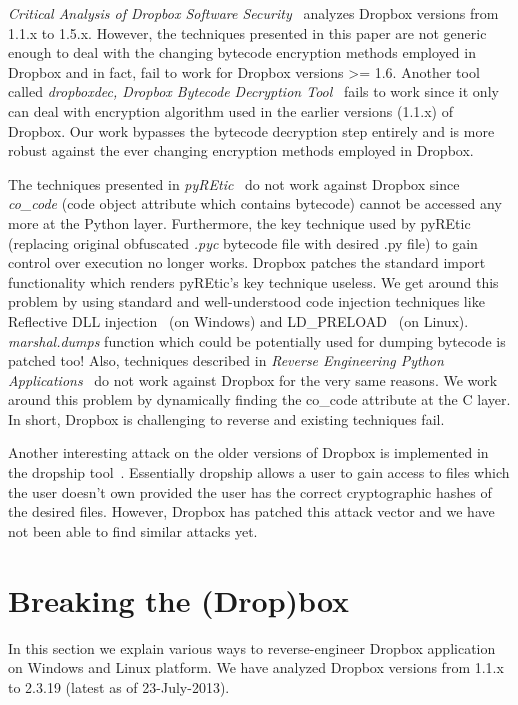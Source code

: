 \documentclass[letterpaper,twocolumn,10pt]{article}
\begin{document}
\emph{Critical Analysis of Dropbox Software Security}~\cite{nicolas2012}
analyzes Dropbox versions from 1.1.x to 1.5.x. However, the techniques
presented in this paper are not generic enough to deal with the changing
bytecode encryption methods employed in Dropbox and in fact, fail to work for
Dropbox versions >= 1.6. Another tool called \emph{dropboxdec, Dropbox Bytecode
Decryption Tool}~\cite{dropboxdec} fails to work since it only can deal with
encryption algorithm used in the earlier versions (1.1.x) of Dropbox. Our work
bypasses the bytecode decryption step entirely and is more robust against the
ever changing encryption methods employed in Dropbox.

The techniques presented in \emph{pyREtic}~\cite{smith2010} do not work against
Dropbox since \emph{co\_code} (code object attribute which contains bytecode)
cannot be accessed any more at the Python layer. Furthermore, the key technique
used by pyREtic (replacing original obfuscated \emph{.pyc} bytecode file with
desired .py file) to gain control over execution no longer works. Dropbox
patches the standard import functionality which renders pyREtic's key technique
useless. We get around this problem by using standard and well-understood code
injection techniques like Reflective DLL injection~\cite{fewer2008reflective}
(on Windows) and LD\_PRELOAD~\cite{LDPRELOAD} (on Linux). \emph{marshal.dumps}
function which could be potentially used for dumping bytecode is patched too!
Also, techniques described in \emph{Reverse Engineering Python
Applications}~\cite{portnoy2008reverse} do not work against Dropbox for the
very same reasons. We work around this problem by dynamically finding the
co\_code attribute at the C layer. In short, Dropbox is challenging to reverse
and existing techniques fail.

Another interesting attack on the older versions of Dropbox is implemented in
the dropship tool~\cite{Dropship}. Essentially dropship allows a user to gain
access to files which the user doesn't own provided the user has the correct
cryptographic hashes of the desired files. However, Dropbox has patched this
attack vector and we have not been able to find similar attacks yet.

\section{Breaking the (Drop)box}
\label{sec:breaking}

In this section we explain various ways to reverse-engineer Dropbox application
on Windows and Linux platform. We have analyzed Dropbox versions from 1.1.x to
2.3.19 (latest as of 23-July-2013).
\end{document}

